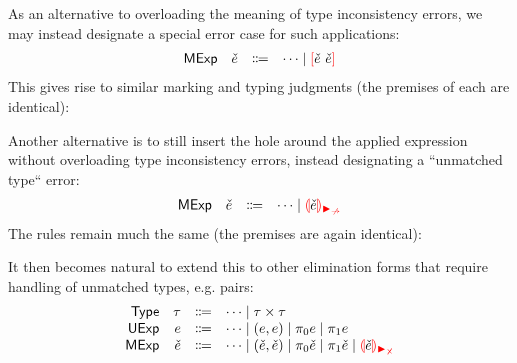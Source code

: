\documentclass{article}
\begin{document}
As an alternative to overloading the meaning of type inconsistency errors, we may instead designate
a special error case for such applications:
%
\[\begin{array}{rrcl}
  \ECMName & \ECMV & \Coloneqq & \cdots \mid \ECApNonMatchedAlt{\ECMV}{\ECMV}
\end{array}\]
%
This gives rise to similar marking and typing judgments (the premises of each are identical):
%
\begin{mathpar}

\end{mathpar}

Another alternative is to still insert the hole around the applied expression without overloading
type inconsistency errors, instead designating a ``unmatched type`` error:
%
\[\begin{array}{rrcl}
  \ECMName & \ECMV & \Coloneqq & \cdots \mid \ECInconMatchedArrow{\ECMV}
\end{array}\]
%
The rules remain much the same (the premises are again identical):
%
\begin{mathpar}

\end{mathpar}

It then becomes natural to extend this to other elimination forms that require handling of unmatched
types, e.g. pairs:
%
\[\begin{array}{rrcl}
  \TMName  & \TMV  & \Coloneqq & \cdots \mid \TPair{\TMV}{\TMV} \\
  \EMName  & \EMV  & \Coloneqq & \cdots
                               \mid \EPair{\EMV}{\EMV}
                               \mid \EProjL{\EMV} \mid \EProjR{\EMV} \\
  \ECMName & \ECMV & \Coloneqq & \cdots
                               \mid \ECPair{\ECMV}{\ECMV}
                               \mid \ECProjL{\ECMV} \mid \ECProjR{\ECMV}
                               \mid \ECInconMatchedPair{\ECMV}
\end{array}\]
\end{document}
